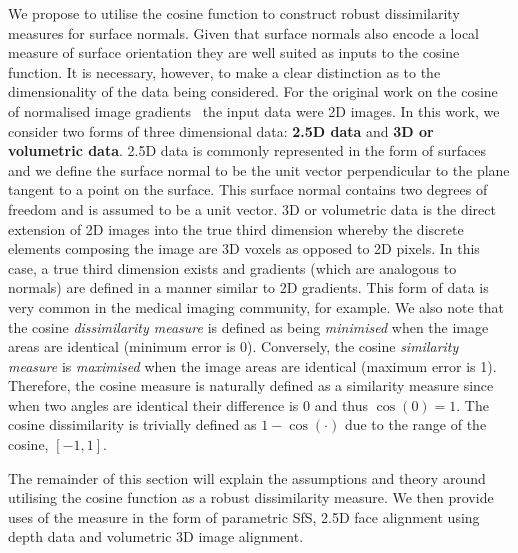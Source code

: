 We propose to utilise the cosine function to construct robust dissimilarity
measures for surface normals. Given that surface normals also encode a local
measure of surface orientation they are well suited as inputs to the cosine
function. It is necessary, however, to make a clear distinction as to the
dimensionality of the data being considered. For the original work
on the cosine of normalised image gradients~\cite{tzimiropoulos2012subspace}
the input data were 2D images. In this work, we consider two forms of three
dimensional data: \textbf{2.5D data} and \textbf{3D or volumetric data}.
2.5D data is commonly represented in the form of surfaces and we define
the surface normal to be the unit vector perpendicular to the plane
tangent to a point on the surface. This surface normal contains
two degrees of freedom and is assumed to be a unit vector. 3D or volumetric
data is the direct extension of 2D images into the true third dimension
whereby the discrete elements composing the image are 3D voxels as opposed to
2D pixels. In this case, a true third dimension exists and gradients (which
are analogous to normals) are defined in a manner similar to 2D gradients. This
form of data is very common in the medical imaging community, for example.
We also note that the cosine \textit{dissimilarity measure} is defined as being
\textit{minimised} when the image areas are identical (minimum error is 0). 
Conversely, the cosine \textit{similarity measure} is \textit{maximised} when 
the image  areas are identical (maximum error is 1). Therefore, the 
cosine measure is naturally defined as a similarity measure since when
two angles are identical their difference is 0 and thus $\cos(0) = 1$. The
cosine dissimilarity is trivially defined as $1 - \cos(\cdot)$ due to the range
of the cosine, $[-1, 1]$.

The remainder of this section will explain the assumptions and theory around
utilising the cosine function as a robust dissimilarity measure. We then
provide uses of the measure in the form of parametric SfS, 2.5D face
alignment using depth data and volumetric 3D image alignment.
